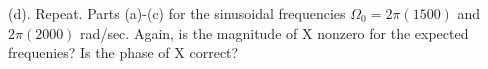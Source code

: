 (d). Repeat. Parts (a)-(c) for the sinusoidal frequencies $\Omega_0 = 2\pi(1500)$ and $2\pi(2000)$ rad/sec. Again, is the magnitude of X nonzero for the expected frequenies? Is the phase of X correct?

